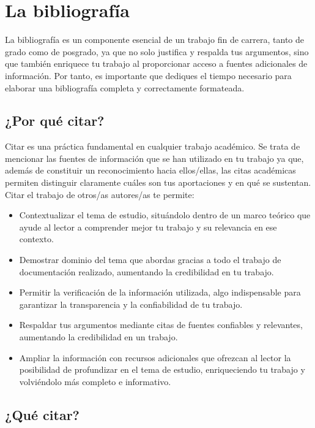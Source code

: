 \chapter{La bibliografía\label{cap:bibliografia}} %

La bibliografía es un componente esencial de un trabajo fin de carrera, tanto de grado como de posgrado, ya que no solo justifica y respalda tus argumentos, sino que también enriquece tu trabajo al proporcionar acceso a fuentes adicionales de información. Por tanto, es importante que dediques el tiempo necesario para elaborar una bibliografía completa y correctamente formateada.

\section{¿Por qué citar?}

Citar es una práctica fundamental en cualquier trabajo académico. Se trata de mencionar las fuentes de información que se han utilizado en tu trabajo ya que, además de constituir un reconocimiento hacia ellos/ellas, las citas académicas permiten distinguir claramente cuáles son tus aportaciones y en qué se sustentan. Citar el trabajo de otros/as autores/as te permite:

\begin{itemize}
    \item Contextualizar el tema de estudio, situándolo dentro de un marco teórico que ayude al lector a comprender mejor tu trabajo y su relevancia en ese contexto.
    \item Demostrar dominio del tema que abordas gracias a todo el trabajo de documentación realizado, aumentando la credibilidad en tu trabajo.
    \item Permitir la verificación de la información utilizada, algo indispensable para  garantizar la transparencia y la confiabilidad de tu trabajo.
    \item Respaldar tus argumentos mediante citas de fuentes confiables y relevantes, aumentando la credibilidad en un trabajo.
    \item Ampliar la información con recursos adicionales que ofrezcan al lector la posibilidad de profundizar en el tema de estudio, enriqueciendo tu trabajo y volviéndolo más completo e informativo.
\end{itemize}

\section{¿Qué citar?}

